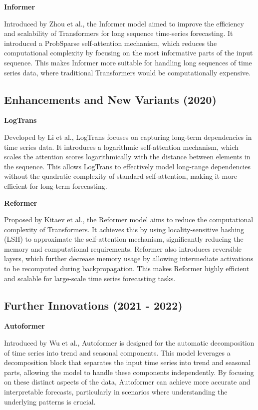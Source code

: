 \noindent\textbf
{Informer}

\noindent Introduced by Zhou et al.\cite{zhou2021informerefficienttransformerlong}, the Informer model aimed to improve the efficiency and scalability of Transformers for long sequence time-series forecasting. It introduced a ProbSparse self-attention mechanism, which reduces the computational complexity by focusing on the most informative parts of the input sequence. This makes Informer more suitable for handling long sequences of time series data, where traditional Transformers would be computationally expensive.
\vspace{10pt}


\subsection{Enhancements and New Variants (2020)}
\noindent\textbf
{LogTrans}

\noindent Developed by Li et al.\cite{li2020enhancinglocalitybreakingmemory}, LogTrans focuses on capturing long-term dependencies in time series data. It introduces a logarithmic self-attention mechanism, which scales the attention scores logarithmically with the distance between elements in the sequence. This allows LogTrans to effectively model long-range dependencies without the quadratic complexity of standard self-attention, making it more efficient for long-term forecasting.
\vspace{10pt}


\noindent\textbf
{Reformer}
 
\noindent Proposed by Kitaev et al.\cite{kitaev2020reformerefficienttransformer}, the Reformer model aims to reduce the computational complexity of Transformers. It achieves this by using locality-sensitive hashing (LSH) to approximate the self-attention mechanism, significantly reducing the memory and computational requirements. Reformer also introduces reversible layers, which further decrease memory usage by allowing intermediate activations to be recomputed during backpropagation. This makes Reformer highly efficient and scalable for large-scale time series forecasting tasks.
\vspace{10pt}


\subsection{Further Innovations (2021 - 2022)}
\noindent\textbf
{Autoformer}
 
\noindent Introduced by Wu et al.\cite{wu2022autoformerdecompositiontransformersautocorrelation}, Autoformer is designed for the automatic decomposition of time series into trend and seasonal components. This model leverages a decomposition block that separates the input time series into trend and seasonal parts, allowing the model to handle these components independently. By focusing on these distinct aspects of the data, Autoformer can achieve more accurate and interpretable forecasts, particularly in scenarios where understanding the underlying patterns is crucial.
\vspace{10pt}


